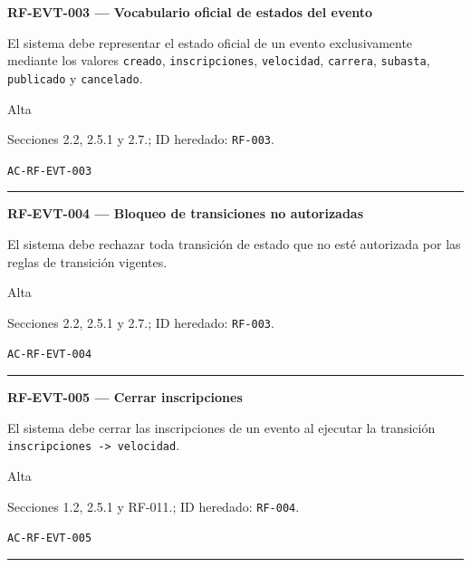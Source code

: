 \documentclass[10pt,letterpaper]{article}
\begin{document}
\noindent\textbf{RF-EVT-003 --- Vocabulario oficial de estados del evento}\par
\begin{description}[style=nextline,leftmargin=3.15cm,labelwidth=2.8cm,font=\normalfont\bfseries]
\item[Obligación] El sistema debe representar el estado oficial de un evento exclusivamente mediante los valores \texttt{creado}, \texttt{inscripciones}, \texttt{velocidad}, \texttt{carrera}, \texttt{subasta}, \texttt{publicado} y \texttt{cancelado}.
\item[Prioridad] Alta
\item[Procedencia] Secciones 2.2, 2.5.1 y 2.7.; ID heredado: \texttt{RF-003}.
\item[Verificación] \texttt{AC-RF-EVT-003}
\end{description}
\vspace{0.25em}\hrule\vspace{0.65em}
\noindent\textbf{RF-EVT-004 --- Bloqueo de transiciones no autorizadas}\par
\begin{description}[style=nextline,leftmargin=3.15cm,labelwidth=2.8cm,font=\normalfont\bfseries]
\item[Obligación] El sistema debe rechazar toda transición de estado que no esté autorizada por las reglas de transición vigentes.
\item[Prioridad] Alta
\item[Procedencia] Secciones 2.2, 2.5.1 y 2.7.; ID heredado: \texttt{RF-003}.
\item[Verificación] \texttt{AC-RF-EVT-004}
\end{description}
\vspace{0.25em}\hrule\vspace{0.65em}
\noindent\textbf{RF-EVT-005 --- Cerrar inscripciones}\par
\begin{description}[style=nextline,leftmargin=3.15cm,labelwidth=2.8cm,font=\normalfont\bfseries]
\item[Obligación] El sistema debe cerrar las inscripciones de un evento al ejecutar la transición \texttt{inscripciones -> velocidad}.
\item[Prioridad] Alta
\item[Procedencia] Secciones 1.2, 2.5.1 y RF-011.; ID heredado: \texttt{RF-004}.
\item[Verificación] \texttt{AC-RF-EVT-005}
\end{description}
\vspace{0.25em}\hrule\vspace{0.65em}
\end{document}
